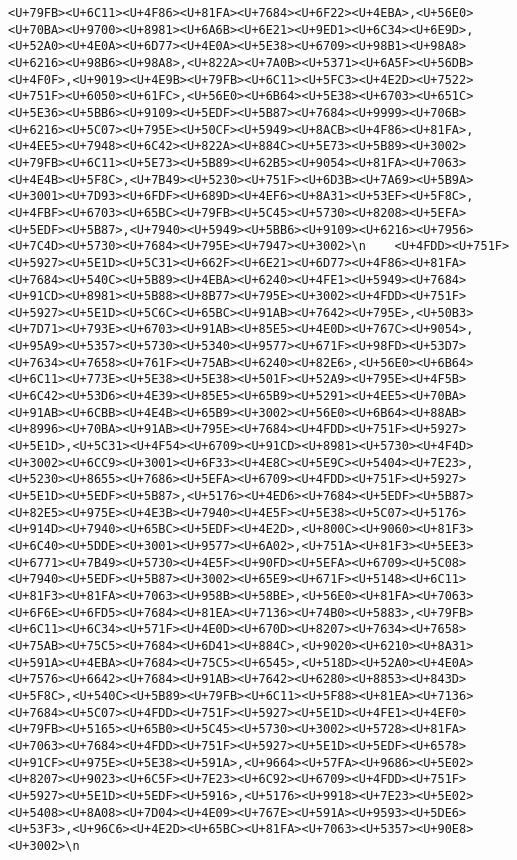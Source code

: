 \documentclass[
]{article}
\begin{document}
\begin{verbatim}
<U+79FB><U+6C11><U+4F86><U+81FA><U+7684><U+6F22><U+4EBA>,<U+56E0><U+70BA><U+9700><U+8981><U+6A6B><U+6E21><U+9ED1><U+6C34><U+6E9D>,<U+52A0><U+4E0A><U+6D77><U+4E0A><U+5E38><U+6709><U+98B1><U+98A8><U+6216><U+98B6><U+98A8>,<U+822A><U+7A0B><U+5371><U+6A5F><U+56DB><U+4F0F>,<U+9019><U+4E9B><U+79FB><U+6C11><U+5FC3><U+4E2D><U+7522><U+751F><U+6050><U+61FC>,<U+56E0><U+6B64><U+5E38><U+6703><U+651C><U+5E36><U+5BB6><U+9109><U+5EDF><U+5B87><U+7684><U+9999><U+706B><U+6216><U+5C07><U+795E><U+50CF><U+5949><U+8ACB><U+4F86><U+81FA>,<U+4EE5><U+7948><U+6C42><U+822A><U+884C><U+5E73><U+5B89><U+3002><U+79FB><U+6C11><U+5E73><U+5B89><U+62B5><U+9054><U+81FA><U+7063><U+4E4B><U+5F8C>,<U+7B49><U+5230><U+751F><U+6D3B><U+7A69><U+5B9A><U+3001><U+7D93><U+6FDF><U+689D><U+4EF6><U+8A31><U+53EF><U+5F8C>,<U+4FBF><U+6703><U+65BC><U+79FB><U+5C45><U+5730><U+8208><U+5EFA><U+5EDF><U+5B87>,<U+7940><U+5949><U+5BB6><U+9109><U+6216><U+7956><U+7C4D><U+5730><U+7684><U+795E><U+7947><U+3002>\n    <U+4FDD><U+751F><U+5927><U+5E1D><U+5C31><U+662F><U+6E21><U+6D77><U+4F86><U+81FA><U+7684><U+540C><U+5B89><U+4EBA><U+6240><U+4FE1><U+5949><U+7684><U+91CD><U+8981><U+5B88><U+8B77><U+795E><U+3002><U+4FDD><U+751F><U+5927><U+5E1D><U+5C6C><U+65BC><U+91AB><U+7642><U+795E>,<U+50B3><U+7D71><U+793E><U+6703><U+91AB><U+85E5><U+4E0D><U+767C><U+9054>,<U+95A9><U+5357><U+5730><U+5340><U+9577><U+671F><U+98FD><U+53D7><U+7634><U+7658><U+761F><U+75AB><U+6240><U+82E6>,<U+56E0><U+6B64><U+6C11><U+773E><U+5E38><U+5E38><U+501F><U+52A9><U+795E><U+4F5B><U+6C42><U+53D6><U+4E39><U+85E5><U+65B9><U+5291><U+4EE5><U+70BA><U+91AB><U+6CBB><U+4E4B><U+65B9><U+3002><U+56E0><U+6B64><U+88AB><U+8996><U+70BA><U+91AB><U+795E><U+7684><U+4FDD><U+751F><U+5927><U+5E1D>,<U+5C31><U+4F54><U+6709><U+91CD><U+8981><U+5730><U+4F4D><U+3002><U+6CC9><U+3001><U+6F33><U+4E8C><U+5E9C><U+5404><U+7E23>,<U+5230><U+8655><U+7686><U+5EFA><U+6709><U+4FDD><U+751F><U+5927><U+5E1D><U+5EDF><U+5B87>,<U+5176><U+4ED6><U+7684><U+5EDF><U+5B87><U+82E5><U+975E><U+4E3B><U+7940><U+4E5F><U+5E38><U+5C07><U+5176><U+914D><U+7940><U+65BC><U+5EDF><U+4E2D>,<U+800C><U+9060><U+81F3><U+6C40><U+5DDE><U+3001><U+9577><U+6A02>,<U+751A><U+81F3><U+5EE3><U+6771><U+7B49><U+5730><U+4E5F><U+90FD><U+5EFA><U+6709><U+5C08><U+7940><U+5EDF><U+5B87><U+3002><U+65E9><U+671F><U+5148><U+6C11><U+81F3><U+81FA><U+7063><U+958B><U+58BE>,<U+56E0><U+81FA><U+7063><U+6F6E><U+6FD5><U+7684><U+81EA><U+7136><U+74B0><U+5883>,<U+79FB><U+6C11><U+6C34><U+571F><U+4E0D><U+670D><U+8207><U+7634><U+7658><U+75AB><U+75C5><U+7684><U+6D41><U+884C>,<U+9020><U+6210><U+8A31><U+591A><U+4EBA><U+7684><U+75C5><U+6545>,<U+518D><U+52A0><U+4E0A><U+7576><U+6642><U+7684><U+91AB><U+7642><U+6280><U+8853><U+843D><U+5F8C>,<U+540C><U+5B89><U+79FB><U+6C11><U+5F88><U+81EA><U+7136><U+7684><U+5C07><U+4FDD><U+751F><U+5927><U+5E1D><U+4FE1><U+4EF0><U+79FB><U+5165><U+65B0><U+5C45><U+5730><U+3002><U+5728><U+81FA><U+7063><U+7684><U+4FDD><U+751F><U+5927><U+5E1D><U+5EDF><U+6578><U+91CF><U+975E><U+5E38><U+591A>,<U+9664><U+57FA><U+9686><U+5E02><U+8207><U+9023><U+6C5F><U+7E23><U+6C92><U+6709><U+4FDD><U+751F><U+5927><U+5E1D><U+5EDF><U+5916>,<U+5176><U+9918><U+7E23><U+5E02><U+5408><U+8A08><U+7D04><U+4E09><U+767E><U+591A><U+9593><U+5DE6><U+53F3>,<U+96C6><U+4E2D><U+65BC><U+81FA><U+7063><U+5357><U+90E8><U+3002>\n    
\end{verbatim}
\end{document}
